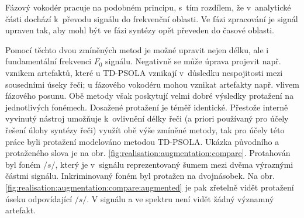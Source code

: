 Fázový vokodér pracuje na podobném principu, s~tím rozdílem, že v~analytické části dochází  k~převodu signálu do frekvenční oblasti.
Ve fázi zpracování je signál upraven tak, aby mohl být ve fázi syntézy opět převeden do časové oblasti.

Pomocí těchto dvou zmíněných metod je možné upravit nejen délku, ale i  fundamentální frekvenci $F_0$ signálu.
Negativně se může úprava projevit např. vznikem artefaktů, které u TD-PSOLA vznikají v~důsledku nespojitosti mezi sousedními úseky řeči; u fázového vokodéru mohou vznikat artefakty např. vlivem fázového posunu.
Obě metody však poskytují velmi dobré výsledky protažení na jednotlivých fonémech.
Dosažené protažení je téměř identické.
Přestože interně vyvinutý nástroj umožňuje k~ovlivnění délky řeči (a priori používaný pro účely řešení úlohy syntézy řeči) využít obě výše zmíněné metody, tak pro účely této práce byli protažení modelováno metodou TD-PSOLA.
Ukázka původního a protaženého slova  je na obr. \ref{fig:realisation:augmentation:compare}.
Protahován byl foném $/s/$, který je v~signálu reprezentovaný šumem mezi dvěma výraznými částmi signálu.
Inkriminovaný foném byl protažen na dvojnásobek.
Na obr. \ref{fig:realisation:augmentation:compare:augmented} je pak zřetelně vidět protažení úseku odpovídající $/s/$.
V signálu a ve spektru není vidět žádný významný artefakt.

